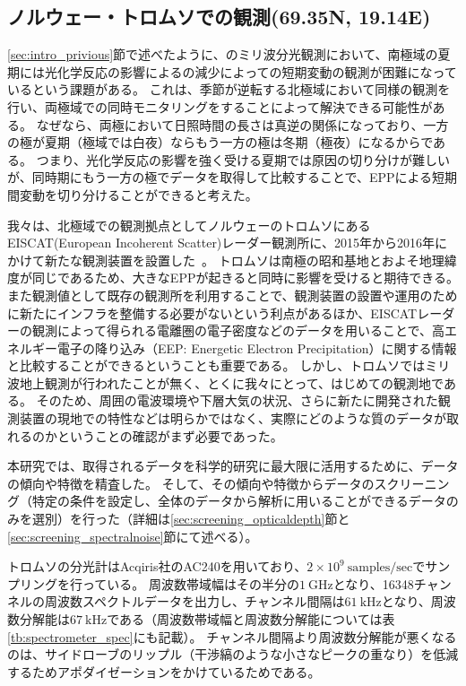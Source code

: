 \subsection{ノルウェー・トロムソでの観測(69.35\textdegree N, 19.14\textdegree E)}
\label{ssec:obs_tromsoe}
\ref{sec:intro_privious}節で述べたように、のミリ波分光観測において、南極域の夏期には光化学反応の影響によるの減少によっての短期変動の観測が困難になっているという課題がある。
これは、季節が逆転する北極域において同様の観測を行い、両極域での同時モニタリングをすることによって解決できる可能性がある。
なぜなら、両極において日照時間の長さは真逆の関係になっており、一方の極が夏期（極域では白夜）ならもう一方の極は冬期（極夜）になるからである。
つまり、光化学反応の影響を強く受ける夏期では原因の切り分けが難しいが、同時期にもう一方の極でデータを取得して比較することで、EPPによる短期間変動を切り分けることができると考えた。\par

我々は、北極域での観測拠点としてノルウェーのトロムソにあるEISCAT(European Incoherent Scatter)レーダー観測所に、2015年から2016年にかけて新たな観測装置を設置した~\cite{ito2017master}。
トロムソは南極の昭和基地とおよそ地理緯度が同じであるため、大きなEPPが起きると同時に影響を受けると期待できる。
また観測値として既存の観測所を利用することで、観測装置の設置や運用のために新たにインフラを整備する必要がないという利点があるほか、EISCATレーダーの観測によって得られる電離圏の電子密度などのデータを用いることで、高エネルギー電子の降り込み（EEP: Energetic Electron Precipitation）に関する情報と比較することができるということも重要である。
しかし、トロムソではミリ波地上観測が行われたことが無く、とくに我々にとって、はじめての観測地である。
そのため、周囲の電波環境や下層大気の状況、さらに新たに開発された観測装置の現地での特性などは明らかではなく、実際にどのような質のデータが取れるのかということの確認がまず必要であった。\par

本研究では、取得されるデータを科学的研究に最大限に活用するために、データの傾向や特徴を精査した。
そして、その傾向や特徴からデータのスクリーニング（特定の条件を設定し、全体のデータから解析に用いることができるデータのみを選別）を行った（詳細は\ref{sec:screening_opticaldepth}節と\ref{sec:screening_spectralnoise}節にて述べる）。\par

トロムソの分光計はAcqiris社のAC240を用いており、$2\times 10^9\ \mathrm{samples/sec}$でサンプリングを行っている。
周波数帯域幅はその半分の$1\ \mathrm{GHz}$となり、16348チャンネルの周波数スペクトルデータを出力し、チャンネル間隔は$61\ \mathrm{kHz}$となり、周波数分解能は$67\ \mathrm{kHz}$である（周波数帯域幅と周波数分解能については表\ref{tb:spectrometer_spec}にも記載）。
チャンネル間隔より周波数分解能が悪くなるのは、サイドローブのリップル（干渉縞のような小さなピークの重なり）を低減するためアポダイゼーションをかけているためである。


